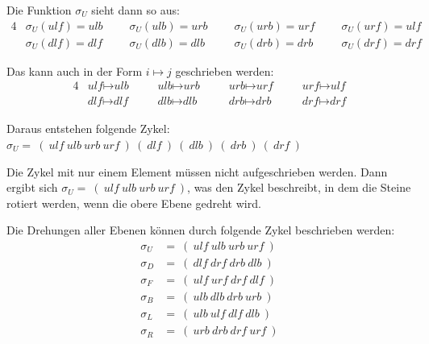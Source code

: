 \documentclass[12pt,a4paper, usenames, dvipsnames]{article}
\theoremstyle{mystyle}
\theoremstyle{definition}
\begin{document}
Die Funktion $\sigma_U$ sieht dann so aus:
\begin{alignat*}{4}
& \sigma_U(\textit{ulf})=\textit{ulb} \ \ \ \ \ \ \ & \sigma_U(\textit{ulb})=\textit{urb} \ \ \ \ \ \ \ & \sigma_U(\textit{urb})=\textit{urf} \ \ \ \ \ \ \ & \sigma_U(\textit{urf})=\textit{ulf} \\
& \sigma_U(\textit{dlf})=\textit{dlf} \ \ \ \ \ \ \ & \sigma_U(\textit{dlb})=\textit{dlb} \ \ \ \ \ \ \ & \sigma_U(\textit{drb})=\textit{drb} \ \ \ \ \ \ \ & \sigma_U(\textit{drf})=\textit{drf} 
\end{alignat*}

Das kann auch in der Form $i \mapsto j$ geschrieben werden: 
\begin{alignat*}{4}
& \textit{ulf} \mapsto \textit{ulb} \ \ \ \ \ \ \ \ & \textit{ulb} \mapsto \textit{urb} \ \ \ \ \ \ \ \ & \textit{urb} \mapsto \textit{urf} \ \ \ \ \ \ \ \ & \textit{urf} \mapsto \textit{ulf} \\
& \textit{dlf} \mapsto \textit{dlf} \ \ \ \ \ \ \ \ & \textit{dlb} \mapsto \textit{dlb} \ \ \ \ \ \ \ \ \ & \textit{drb} \mapsto \textit{drb} \ \ \ \ \ \ \ \ & \textit{drf} \mapsto \textit{drf} 
\end{alignat*}

Daraus entstehen folgende Zykel: $\sigma_U = \ ( \ \textit{ulf} \ \textit{ulb} \ \textit{urb} \ \textit{urf} \ )\ ( \ \textit{dlf} \ )\ ( \ \textit{dlb} \ )\ ( \ \textit{drb} \ )\ ( \ \textit{drf} \ )$

Die Zykel mit nur einem Element müssen nicht aufgeschrieben werden. Dann ergibt sich $\sigma_U = \ ( \ \textit{ulf} \ \textit{ulb} \ \textit{urb} \ \textit{urf} \ )$, was den Zykel beschreibt, in dem die Steine rotiert werden, wenn die obere Ebene gedreht wird. 


Die Drehungen aller Ebenen können durch folgende Zykel beschrieben werden: 
\begin{align*}
\sigma_U & =\ ( \ \textit{ulf} \ \textit{ulb} \ \textit{urb} \ \textit{urf} \ ) \\
\sigma_D & =\ ( \ \textit{dlf} \ \textit{drf} \ \textit{drb} \ \textit{dlb} \ ) \\
\sigma_F & =\ ( \ \textit{ulf} \ \textit{urf} \ \textit{drf} \ \textit{dlf} \ ) \\
\sigma_B & =\ ( \ \textit{ulb} \ \textit{dlb} \ \textit{drb} \ \textit{urb} \ ) \\
\sigma_L & =\ ( \ \textit{ulb} \ \textit{ulf} \ \textit{dlf} \ \textit{dlb} \ ) \\
\sigma_R & =\ ( \ \textit{urb} \ \textit{drb} \ \textit{drf} \ \textit{urf} \ ) \\
\end{align*}
\end{document}
